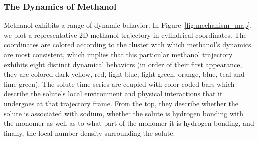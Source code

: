 \documentclass[journal=jpcbfk,manuscript=article]{achemso}
\begin{document}
  \subsubsection*{The Dynamics of Methanol}
  
  Methanol exhibits a range of dynamic behavior. In Figure~\ref{fig:mechanism_map}, we
  plot a representative 2D methanol trajectory in cylindrical coordinates. The coordinates
  are colored according to the cluster with which methanol's dynamics are most consistent,
  which implies that this particular methanol trajectory exhibits eight distinct dynamical 
  behaviors (in order of their first appearance, they are colored dark yellow, red, light
  blue, light green, orange, blue, teal and lime green). The solute time series are coupled
  with color coded bars which describe the solute's local environment and physical 
  interactions that it undergoes at that trajectory frame. From the top, they describe 
  whether the solute is associated with sodium, whether the solute is hydrogen bonding
  with the monomer as well as to what part of the monomer it is hydrogen bonding, and 
  finally, the local number density surrounding the solute. 
\end{document}
